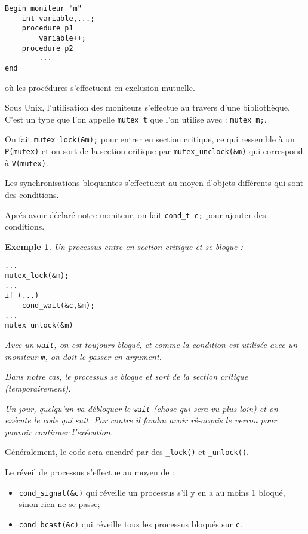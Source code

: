 \documentclass[12pt,a4paper]{report}
\newtheorem*{ex}{Exemple}
\begin{document}
\begin{verbatim}
Begin moniteur "m"
    int variable,...;
    procedure p1
        variable++;
    procedure p2
        ...
end
\end{verbatim}

où les procédures s'effectuent en exclusion mutuelle.

Sous Unix, l'utilisation des moniteurs s'effectue au travers d'une bibliothèque. C'est un type que l'on appelle \verb?mutex_t? que l'on utilise avec : \verb?mutex m;?.

On fait \verb?mutex_lock(&m);? pour entrer en section critique, ce qui ressemble à un \verb?P(mutex)? et on sort de la section critique par \verb?mutex_unclock(&m)? qui correspond à \verb?V(mutex)?.

Les synchronisations bloquantes s'effectuent au moyen d'objets différents qui sont des \og conditions\fg{}.

Aprés avoir déclaré notre moniteur, on fait \verb?cond_t c;? pour ajouter des conditions.

\begin{ex}
  Un processus entre en section critique et se bloque :
  \begin{center}
\begin{verbatim}
...
mutex_lock(&m);
...
if (...)
    cond_wait(&c,&m);
...
mutex_unlock(&m)
\end{verbatim}
  \end{center}

Avec un \verb?wait?, on est toujours bloqué, et comme la condition est utilisée avec un moniteur \verb?m?, on doit le passer en argument.

Dans notre cas, le processus se bloque et sort de la section critique (temporairement).

Un jour, quelqu'un va débloquer le \verb?wait? (chose qui sera vu plus loin) et on exécute le code qui suit. Par contre il faudra avoir ré-acquis le verrou pour pouvoir continuer l'exécution.
\end{ex}

Généralement, le code sera encadré par des \verb?_lock()? et \verb?_unlock()?.

Le réveil de processus s'effectue au moyen de :
\begin{itemize}
\item \verb?cond_signal(&c)? qui réveille un processus s'il y en a au moins 1 bloqué, sinon rien ne se passe;
\item \verb?cond_bcast(&c)? qui réveille tous les processus bloqués sur \texttt{c}.
\end{itemize}
\end{document}
